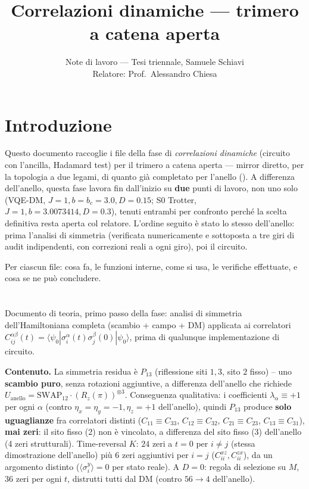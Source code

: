 \documentclass[11pt,a4paper]{article}
\title{Correlazioni dinamiche — trimero a catena aperta}
\author{Note di lavoro — Tesi triennale, Samuele Schiavi\\ Relatore: Prof.\ Alessandro Chiesa}
\date{}
\begin{document}
\maketitle

\section*{Introduzione}

Questo documento raccoglie i file della fase di \emph{correlazioni dinamiche} (circuito con
l'ancilla, Hadamard test) per il trimero a catena aperta — mirror diretto, per la topologia a due
legami, di quanto già completato per l'anello
(\texttt{}). A differenza dell'anello, questa fase
lavora fin dall'inizio su \textbf{due} punti di lavoro, non uno solo (VQE-DM,
$J{=}1,b{=}b_c{=}3.0,D{=}0.15$; S0 Trotter, $J{=}1,b{=}3.0073414,D{=}0.3$), tenuti entrambi per
confronto perché la scelta definitiva resta aperta col relatore. L'ordine seguito è stato lo
stesso dell'anello: prima l'analisi di simmetria (verificata numericamente e sottoposta a tre
giri di audit indipendenti, con correzioni reali a ogni giro), poi il circuito.

Per ciascun file: cosa fa, le funzioni interne, come si usa, le verifiche effettuate, e cosa se ne
può concludere.

\section*{\texttt{}}

Documento di teoria, primo passo della fase: analisi di simmetria dell'Hamiltoniana completa
(scambio + campo + DM) applicata ai correlatori
$C_{ij}^{\alpha\beta}(t)=\langle\psi_0|\sigma_i^\alpha(t)\sigma_j^\beta(0)|\psi_0\rangle$, prima di
qualunque implementazione di circuito.

\textbf{Contenuto.} La simmetria residua è $P_{13}$ (riflessione siti $1,3$, sito $2$ fisso) --
uno \textbf{scambio puro}, senza rotazioni aggiuntive, a differenza dell'anello che richiede
$U_\text{anello}=\mathrm{SWAP}_{12}\cdot(R_z(\pi))^{\otimes3}$. Conseguenza qualitativa: i
coefficienti $\lambda_\alpha\equiv+1$ per ogni $\alpha$ (contro $\eta_x=\eta_y=-1,\eta_z=+1$
dell'anello), quindi $P_{13}$ produce \textbf{solo uguaglianze} fra correlatori distinti
($C_{11}\equiv C_{33}$, $C_{12}\equiv C_{32}$, $C_{21}\equiv C_{23}$, $C_{13}\equiv C_{31}$),
\textbf{mai zeri}: il sito fisso (2) non è vincolato, a differenza del sito fisso (3) dell'anello
(4 zeri strutturali). Time-reversal $K$: $24$ zeri a $t=0$ per $i\neq j$ (stessa dimostrazione
dell'anello) più $6$ zeri aggiuntivi per $i=j$ ($C_{ii}^{xz},C_{ii}^{zx}$), da un argomento
distinto ($\langle\sigma_i^y\rangle=0$ per stato reale). A $D=0$: regola di selezione su $M$, $36$
zeri per ogni $t$, distrutti tutti dal DM (contro $56\to4$ dell'anello).
\end{document}
